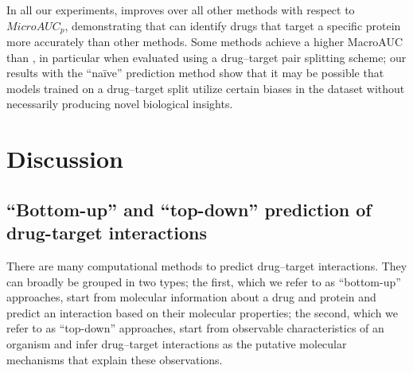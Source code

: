 \documentclass{bioinfo}
\begin{document}
In all our experiments, \name{} improves over all other methods with
respect to $MicroAUC_p$, demonstrating that \name{} can identify drugs
that target a specific protein more accurately than other
methods. Some methods achieve a higher MacroAUC than \name{}, in
particular when evaluated using a drug--target pair splitting scheme;
our results with the ``na\"ive'' prediction method show that it may be
possible that models trained on a drug--target split utilize certain
biases in the dataset without necessarily producing novel biological
insights.

\section{Discussion}

\subsection{``Bottom-up'' and ``top-down'' prediction of drug-target interactions}

There are many computational methods to predict drug--target
interactions. They can broadly be grouped in two types; the first,
which we refer to as ``bottom-up'' approaches, start from molecular
information about a drug and protein and predict an interaction based
on their molecular properties; the second, which we refer to as
``top-down'' approaches, start from observable characteristics of an
organism and infer drug--target interactions as the putative molecular
mechanisms that explain these observations.
\end{document}
